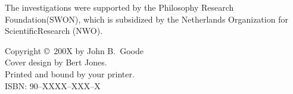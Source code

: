 {%
%
\noindent%
The investigations were supported by the            %
Philosophy Research Foundation\linebreak (SWON), 
which is subsidized by the Netherlands 
Organization for Scientific\linebreak Research (NWO).
\par\vspace {2cm}

%

%
\noindent%
Copyright \copyright\ 200X by John B.\ Goode\\[2ex] %
Cover design by Bert Jones.\\                       %
Printed and bound by your printer.\\[2ex]           %
ISBN: 90--XXXX--XXX--X                              %



}
